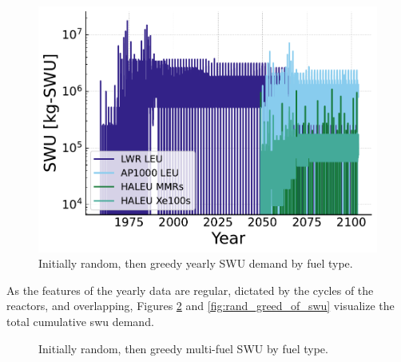 \begin{figure}[H]
    \centering
    \includegraphics[scale=0.7]{images/results/swu/multi_drgng_swu_by_fuel.pdf}
    \caption{Initially random, then greedy yearly SWU demand by fuel type.}
    \label{fig:swu_yearly_rand_greed}
\end{figure}

As the features of the yearly data are regular, dictated by the cycles of the reactors, and overlapping, Figures \ref{fig:rand_greed_mf_swu} and \ref{fig:rand_greed_of_swu} visualize the total cumulative \gls{swu} demand.


\begin{figure}[H]
  \hfill
  \caption{Initially random, then greedy multi-fuel SWU by fuel type.}
  \label{fig:rand_greed_mf_swu}
\end{figure}



